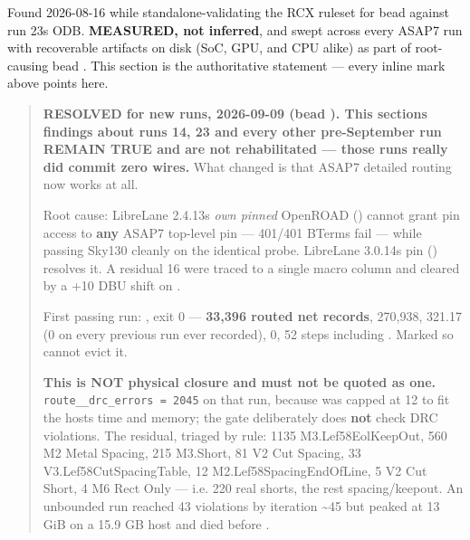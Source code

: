 \begin{record}

Found 2026-08-16 while standalone-validating the RCX ruleset for bead
 against run 23\textquotesingle s ODB. \textbf{MEASURED, not
inferred}, and swept across every ASAP7 run with recoverable artifacts
on disk (SoC, GPU, and CPU alike) as part of root-causing bead
. This section is the authoritative
statement --- every inline \warn{} mark above points here.

\begin{quote}
\textbf{RESOLVED for new runs, 2026-09-09 (bead ). This
section\textquotesingle s findings about runs 14, 23 and every other
pre-September run REMAIN TRUE and are not rehabilitated --- those runs
really did commit zero wires.} What changed is that ASAP7 detailed
routing now works at all.

Root cause: LibreLane 2.4.13\textquotesingle s \emph{own pinned}
OpenROAD () cannot grant pin access to \textbf{any} ASAP7
top-level pin --- 401/401 BTerms fail --- while passing Sky130 cleanly
on the identical probe. LibreLane 3.0.14\textquotesingle s pin
() resolves it. A residual 16  were traced
to a single macro column and cleared by a +10 DBU shift on
.

First passing run: \textbf{},
 exit 0 --- \textbf{33,396
routed net records},  270,938,
 321.17 (0 on every previous run ever
recorded),  0, 52 steps including
. Marked  so  cannot
evict it.

\warn{} \textbf{This is NOT physical closure and must not be quoted as
one.}
\texttt{route\_\allowbreak{}\_\allowbreak{}drc\_\allowbreak{}errors\ =\allowbreak{}\ 2045}
on that run, because  was capped at 12 to fit the
host\textquotesingle s time and memory; the gate deliberately does
\textbf{not} check DRC violations. The residual, triaged by rule: 1135
M3.Lef58EolKeepOut, 560 M2 Metal Spacing, 215 M3.Short, 81 V2 Cut
Spacing, 33 V3.Lef58CutSpacingTable, 12 M2.Lef58SpacingEndOfLine, 5 V2
Cut Short, 4 M6 Rect Only --- i.e. 220 real shorts, the rest
spacing/\allowbreak{}keepout. An unbounded run reached 43 violations by
iteration \textasciitilde45 but peaked at 13 GiB on a 15.9 GB host and
died before .


\end{quote}
\end{record}
